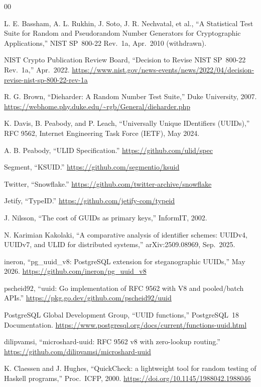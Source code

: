 \documentclass{svproc}
\begin{document}
\begin{thebibliography}{00}

L. E. Bassham, A. L. Rukhin, J. Soto, J. R. Nechvatal, et al., ``A Statistical Test Suite for Random and Pseudorandom Number Generators for Cryptographic Applications,'' NIST SP~800-22 Rev.~1a, Apr.~2010 (withdrawn).

NIST Crypto Publication Review Board, ``Decision to Revise NIST SP~800-22
Rev.~1a,'' Apr.~2022.
\url{https://www.nist.gov/news-events/news/2022/04/decision-revise-nist-sp-800-22-rev-1a}

R. G. Brown, ``Dieharder: A Random Number Test Suite,'' Duke University, 2007. \url{https://webhome.phy.duke.edu/~rgb/General/dieharder.php}

K. Davis, B. Peabody, and P. Leach, ``Universally Unique IDentifiers (UUIDs),'' RFC 9562, Internet Engineering Task Force (IETF), May 2024.

A. B. Peabody, ``ULID Specification.'' \url{https://github.com/ulid/spec}

Segment, ``KSUID.'' \url{https://github.com/segmentio/ksuid}

Twitter, ``Snowflake.'' \url{https://github.com/twitter-archive/snowflake}

Jetify, ``TypeID.'' \url{https://github.com/jetify-com/typeid}

J. Nilsson, ``The cost of GUIDs as primary keys,'' InformIT, 2002.

N. Karimian Kakolaki, ``A comparative analysis of identifier schemes: UUIDv4, UUIDv7, and ULID for distributed systems,'' arXiv:2509.08969, Sep.~2025.

ineron, ``pg\_uuid\_v8: PostgreSQL extension for steganographic UUIDs,'' May 2026. \url{https://github.com/ineron/pg_uuid_v8}

pscheid92, ``uuid: Go implementation of RFC 9562 with V8 and pooled/batch APIs.'' \url{https://pkg.go.dev/github.com/pscheid92/uuid}

PostgreSQL Global Development Group, ``UUID functions,'' PostgreSQL~18 Documentation. \url{https://www.postgresql.org/docs/current/functions-uuid.html}

dilipvamsi, ``microshard-uuid: RFC 9562 v8 with zero-lookup routing.'' \url{https://github.com/dilipvamsi/microshard-uuid}

K. Claessen and J. Hughes, ``QuickCheck: a lightweight tool for random testing of Haskell programs,'' Proc.\ ICFP, 2000. \url{https://doi.org/10.1145/1988042.1988046}


\end{thebibliography}
\end{document}

